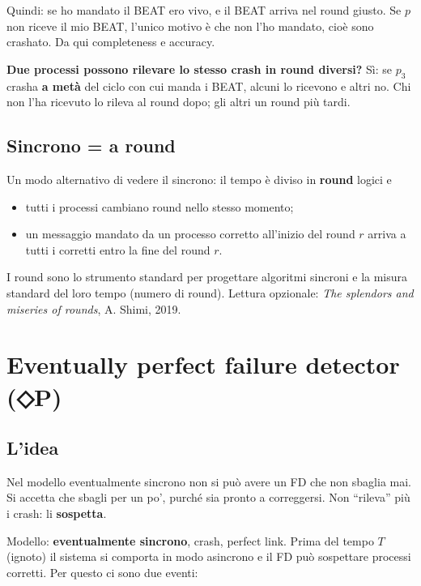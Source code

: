 Quindi: se ho mandato il BEAT ero vivo, e il BEAT arriva nel round giusto. Se \(p\) non riceve il mio BEAT, l'unico motivo è che non l'ho mandato, cioè sono crashato. Da qui completeness e accuracy.

\textbf{Due processi possono rilevare lo stesso crash in round diversi?} Sì: se \(p_3\) crasha \textbf{a metà} del ciclo con cui manda i BEAT, alcuni lo ricevono e altri no. Chi non l'ha ricevuto lo rileva al round dopo; gli altri un round più tardi.

\subsection{Sincrono = a round}

Un modo alternativo di vedere il sincrono: il tempo è diviso in \textbf{round} logici e

\begin{itemize}
\tightlist
\item
  tutti i processi cambiano round nello stesso momento;
\item
  un messaggio mandato da un processo corretto all'inizio del round \(r\) arriva a tutti i corretti entro la fine del round \(r\).
\end{itemize}

I round sono lo strumento standard per progettare algoritmi sincroni e la misura standard del loro tempo (numero di round). Lettura opzionale: \emph{The splendors and miseries of rounds}, A. Shimi, 2019.

\section{Eventually perfect failure detector (◇P)}

\subsection{L'idea}

\begin{inbreve}

Nel modello eventualmente sincrono non si può avere un FD che non sbaglia mai. Si accetta che sbagli per un po', purché sia pronto a correggersi. Non ``rileva'' più i crash: li \textbf{sospetta}.

\end{inbreve}

Modello: \textbf{eventualmente sincrono}, crash, perfect link. Prima del tempo \(T\) (ignoto) il sistema si comporta in modo asincrono e il FD può sospettare processi corretti. Per questo ci sono due eventi:

